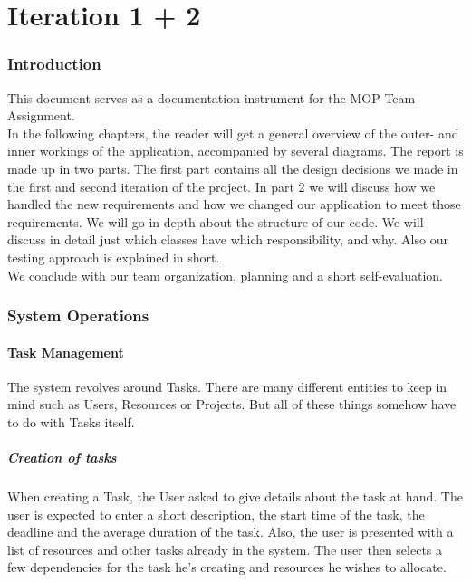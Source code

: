 



\maakvoorblad

\newpage
\thispagestyle{empty}
\mbox{}

\newpage
\maakvoorblad

\newpage

\tableofcontents

\newpage

\part{Iteration 1 + 2}

\section{Introduction}
		This document serves as a documentation instrument for the MOP Team Assignment.\\
		In the following chapters, the reader will get a general overview of the outer- and inner workings of the application, accompanied by several diagrams. The report is made up in two parts. The first part contains all the design decisions we made in the first and second iteration of the project. In part 2 we will discuss how we handled the new requirements and how we changed our application to meet those requirements.
		We will go in depth about the structure of our code. We will discuss in detail just which classes have which responsibility, and why. Also our testing approach is explained in short.\\
		We conclude with our team organization, planning and a short self-evaluation.
	\section{System Operations}
		\subsection{Task Management}
			The system revolves around Tasks. There are many different entities to keep in mind such as Users, Resources or Projects.
			But all of these things somehow have to do with Tasks itself.
			\subsubsection{Creation of tasks}
				When creating a Task, the User asked to give details about the task at hand. The user is expected to enter a short description, the start time of the task, the deadline and the average duration of the task.
				Also, the user is presented with a list of resources and other tasks already in the system. The user then selects a few dependencies for the task he's creating and resources he wishes to allocate.


